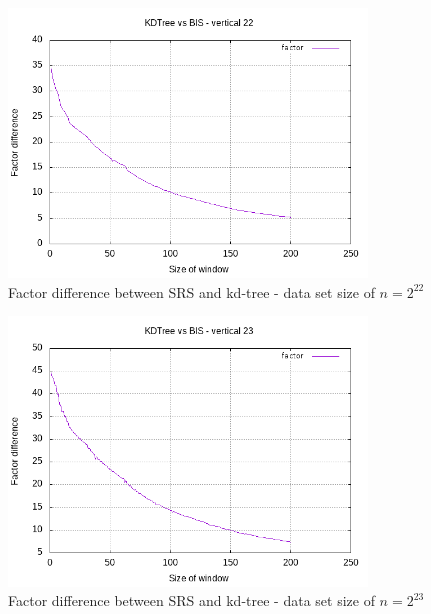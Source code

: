 \begin{figure}[h]
    \centering
    \includegraphics[width = 0.85\textwidth]{pictures/analysis/smalls/vert_fac_22.png}
    \caption{Factor difference between SRS and kd-tree - data set size of $n=2^{22}$}\label{fig:small_vert_fac_22}
\end{figure}

\begin{figure}[h]
    \centering
    \includegraphics[width = 0.85\textwidth]{pictures/analysis/smalls/vert_fac_23.png}
    \caption{Factor difference between SRS and kd-tree - data set size of $n=2^{23}$}\label{fig:small_vert_fac_23}
\end{figure}

